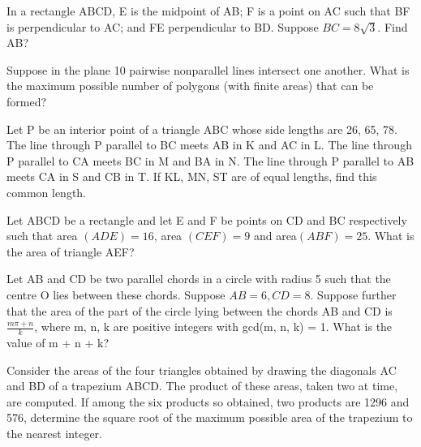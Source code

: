 \item In a rectangle ABCD, E is the midpoint of AB; F is a point on AC such that BF is perpendicular to AC; and FE perpendicular to BD. Suppose $BC = 8\sqrt{3}$. Find AB?

\item Suppose in the plane 10 pairwise nonparallel lines intersect one another. What is the maximum possible number of polygons (with ﬁnite areas) that can be formed?

\item  Let P be an interior point of a triangle ABC whose side lengths are 26, 65, 78. The line through P parallel to BC meets AB in K and AC in L. The line through P parallel to CA meets BC in M and BA in N. The line through P parallel to AB meets CA in S and CB in T. If KL, MN, ST are of equal lengths, find this common length.

\item  Let ABCD be a rectangle and let E and F be points on CD and BC respectively such that area $(ADE) = 16$,  area 
$(CEF) = 9$ and area$(ABF) = 25$. What is the area of triangle AEF? 

\item  Let AB and CD be two parallel chords in a circle with radius 5 such that the centre O lies between these chords. Suppose $AB = 6 , CD = 8$. Suppose further that the area of the part of the circle lying between the chords AB and CD is 
$\frac{m \pi + n}{k}$, where m, n, k are positive integers with gcd(m, n, k) = 1. What is the value of m + n + k? 

\item Consider the areas of the four triangles obtained by drawing the diagonals AC and BD of a trapezium ABCD. The product of these areas, taken two at time, are computed. If among the six products so obtained, two products are 1296 and 576, determine the square root of the maximum possible area of the trapezium to the nearest integer.


